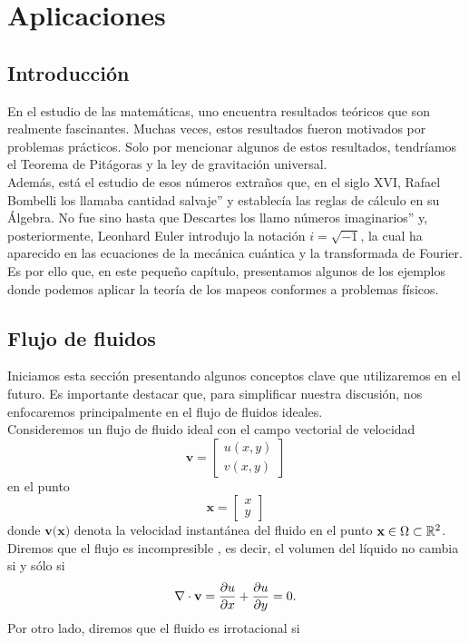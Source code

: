 \chapter{Aplicaciones} \label{Aplicaciones }

\section{Introducción}\label{intro_aplicaciones}

En el estudio de las matemáticas, uno encuentra resultados teóricos que son realmente fascinantes. Muchas veces, estos resultados fueron motivados por problemas prácticos. Solo por mencionar algunos de estos resultados, tendríamos el Teorema de Pitágoras y la ley de gravitación universal.\\
Además, está el estudio de esos números extraños que, en el siglo XVI, Rafael Bombelli los llamaba \capertura cantidad  salvaje'' y establecía las reglas de cálculo en su Álgebra. No fue sino hasta que Descartes los llamo \capertura números imaginarios'' y, posteriormente, Leonhard Euler introdujo la notación $i =\sqrt{-1}$, la cual ha aparecido en las ecuaciones de la mecánica cuántica y la transformada de Fourier.\\
Es por ello que, en este pequeño capítulo, presentamos algunos de los ejemplos donde podemos aplicar la teoría de los mapeos conformes a problemas físicos. 
\section{Flujo de fluidos}
Iniciamos esta sección presentando algunos conceptos clave que utilizaremos en el futuro. Es importante destacar que, para simplificar nuestra discusión, nos enfocaremos principalmente en el flujo de fluidos ideales.\\
Consideremos  un flujo de fluido ideal con el campo vectorial de velocidad
\[
	\textbf{v}=\left[\begin{array}{c}
		u(x,y)\\
		v(x,y)
	\end{array}\right]
\]
en el punto \[
\textbf{x}=\left[\begin{array}{c}
	x\\
	y\end{array}\right]
\]
donde $\textbf{v(x)}$ denota la velocidad instantánea del fluido en el punto $\textbf{x}\in \Omega\subset \mathbb{R}^{2}$. Diremos que el flujo es incompresible , es decir, el volumen del líquido no cambia si y sólo si 
\begin{equation}\label{ec3-1}
	\nabla \cdot \textbf{v} =\dfrac{\partial u}{\partial x}+\dfrac{\partial u}{\partial y}=0.
\end{equation}
Por otro lado, diremos que el fluido es irrotacional si

